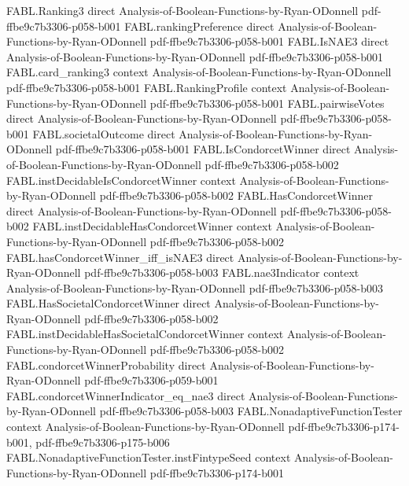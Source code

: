 \begin{theorem}
\proofstep
  {FABL.Ranking3}
  {direct}
  {Analysis-of-Boolean-Functions-by-Ryan-ODonnell}
  {pdf-ffbe9c7b3306-p058-b001}
\proofstep
  {FABL.rankingPreference}
  {direct}
  {Analysis-of-Boolean-Functions-by-Ryan-ODonnell}
  {pdf-ffbe9c7b3306-p058-b001}
\proofstep
  {FABL.IsNAE3}
  {direct}
  {Analysis-of-Boolean-Functions-by-Ryan-ODonnell}
  {pdf-ffbe9c7b3306-p058-b001}
\proofstep
  {FABL.card_ranking3}
  {context}
  {Analysis-of-Boolean-Functions-by-Ryan-ODonnell}
  {pdf-ffbe9c7b3306-p058-b001}
\proofstep
  {FABL.RankingProfile}
  {context}
  {Analysis-of-Boolean-Functions-by-Ryan-ODonnell}
  {pdf-ffbe9c7b3306-p058-b001}
\proofstep
  {FABL.pairwiseVotes}
  {direct}
  {Analysis-of-Boolean-Functions-by-Ryan-ODonnell}
  {pdf-ffbe9c7b3306-p058-b001}
\proofstep
  {FABL.societalOutcome}
  {direct}
  {Analysis-of-Boolean-Functions-by-Ryan-ODonnell}
  {pdf-ffbe9c7b3306-p058-b001}
\proofstep
  {FABL.IsCondorcetWinner}
  {direct}
  {Analysis-of-Boolean-Functions-by-Ryan-ODonnell}
  {pdf-ffbe9c7b3306-p058-b002}
\proofstep
  {FABL.instDecidableIsCondorcetWinner}
  {context}
  {Analysis-of-Boolean-Functions-by-Ryan-ODonnell}
  {pdf-ffbe9c7b3306-p058-b002}
\proofstep
  {FABL.HasCondorcetWinner}
  {direct}
  {Analysis-of-Boolean-Functions-by-Ryan-ODonnell}
  {pdf-ffbe9c7b3306-p058-b002}
\proofstep
  {FABL.instDecidableHasCondorcetWinner}
  {context}
  {Analysis-of-Boolean-Functions-by-Ryan-ODonnell}
  {pdf-ffbe9c7b3306-p058-b002}
\proofstep
  {FABL.hasCondorcetWinner_iff_isNAE3}
  {direct}
  {Analysis-of-Boolean-Functions-by-Ryan-ODonnell}
  {pdf-ffbe9c7b3306-p058-b003}
\proofstep
  {FABL.nae3Indicator}
  {context}
  {Analysis-of-Boolean-Functions-by-Ryan-ODonnell}
  {pdf-ffbe9c7b3306-p058-b003}
\proofstep
  {FABL.HasSocietalCondorcetWinner}
  {direct}
  {Analysis-of-Boolean-Functions-by-Ryan-ODonnell}
  {pdf-ffbe9c7b3306-p058-b002}
\proofstep
  {FABL.instDecidableHasSocietalCondorcetWinner}
  {context}
  {Analysis-of-Boolean-Functions-by-Ryan-ODonnell}
  {pdf-ffbe9c7b3306-p058-b002}
\proofstep
  {FABL.condorcetWinnerProbability}
  {direct}
  {Analysis-of-Boolean-Functions-by-Ryan-ODonnell}
  {pdf-ffbe9c7b3306-p059-b001}
\proofstep
  {FABL.condorcetWinnerIndicator_eq_nae3}
  {direct}
  {Analysis-of-Boolean-Functions-by-Ryan-ODonnell}
  {pdf-ffbe9c7b3306-p058-b003}
\proofstep
  {FABL.NonadaptiveFunctionTester}
  {context}
  {Analysis-of-Boolean-Functions-by-Ryan-ODonnell}
  {pdf-ffbe9c7b3306-p174-b001,
    pdf-ffbe9c7b3306-p175-b006}
\proofstep
  {FABL.NonadaptiveFunctionTester.instFintypeSeed}
  {context}
  {Analysis-of-Boolean-Functions-by-Ryan-ODonnell}
  {pdf-ffbe9c7b3306-p174-b001}

\end{theorem}
